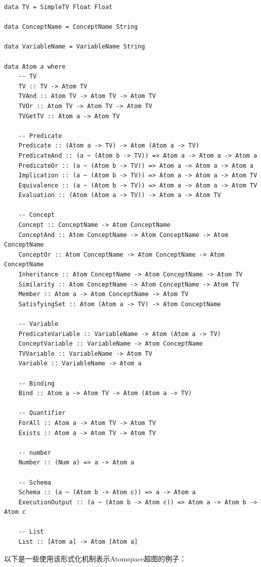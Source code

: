 \begin{verbatim}
data TV = SimpleTV Float Float

data ConceptName = ConceptName String

data VariableName = VariableName String

data Atom a where
	-- TV
	TV :: TV -> Atom TV
	TVAnd :: Atom TV -> Atom TV -> Atom TV
	TVOr :: Atom TV -> Atom TV -> Atom TV
	TVGetTV :: Atom a -> Atom TV

	-- Predicate
	Predicate :: (Atom a -> TV) -> Atom (Atom a -> TV)
	PredicateAnd :: (a ~ (Atom b -> TV)) => Atom a -> Atom a -> Atom a
	PredicateOr :: (a ~ (Atom b -> TV)) => Atom a -> Atom a -> Atom a
	Implication :: (a ~ (Atom b -> TV)) => Atom a -> Atom a -> Atom TV
	Equivalence :: (a ~ (Atom b -> TV)) => Atom a -> Atom a -> Atom TV
	Evaluation :: (Atom (Atom a -> TV)) -> Atom a -> Atom TV

	-- Concept
	Concept :: ConceptName -> Atom ConceptName
	ConceptAnd :: Atom ConceptName -> Atom ConceptName -> Atom ConceptName
	ConceptOr :: Atom ConceptName -> Atom ConceptName -> Atom ConceptName
	Inheritance :: Atom ConceptName -> Atom ConceptName -> Atom TV
	Similarity :: Atom ConceptName -> Atom ConceptName -> Atom TV
	Member :: Atom a -> Atom ConceptName -> Atom TV
	SatisfyingSet :: Atom (Atom a -> TV) -> Atom ConceptName
	
	-- Variable
	PredicateVariable :: VariableName -> Atom (Atom a -> TV)
	ConceptVariable :: VariableName -> Atom ConceptName
	TVVariable :: VariableName -> Atom TV
	Variable :: VariableName -> Atom a

	-- Binding
	Bind :: Atom a -> Atom TV -> Atom (Atom a -> TV)

	-- Quantifier
	ForAll :: Atom a -> Atom TV -> Atom TV
	Exists :: Atom a -> Atom TV -> Atom TV

	-- number
	Number :: (Num a) => a -> Atom a

	-- Schema
	Schema :: (a ~ (Atom b -> Atom c)) => a -> Atom a
	ExecutionOutput :: (a ~ (Atom b -> Atom c)) => Atom a -> Atom b -> Atom c

	-- List
	List :: [Atom a] -> Atom [Atom a]
\end{verbatim}	

以下是一些使用该形式化机制表示Atomspace超图的例子：

